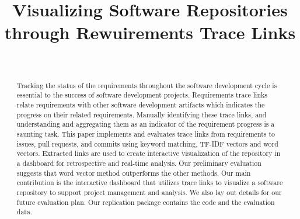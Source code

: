 \documentclass[conference]{IEEEtran}
\begin{document}
\title{Visualizing Software Repositories through Rewuirements Trace Links}

\author{
  \\
}


\maketitle
\begin{abstract}
  Tracking the status of the requirements throughout the software development cycle is essential to the success of software development projects.
  Requirements trace links relate requirements with other software development artifacts which indicates the progress on their related requirements. Manually identifying these trace links, and  understanding and aggregating them as an indicator of the requirement progress is a saunting task.
  This paper implements and evaluates trace links from requirements to issues, pull requests, and commits using keyword matching, TF-IDF vectors and word vectors. Extracted links are used to create interactive visualization of the repository in a dashboard for retrospective and real-time analysis.
  Our preliminary evaluation suggests that word vector method outperforms the other methods.
  Our main contribution is the interactive dashboard that utilizes trace links to visualize a software repository to support project management and analysis. We also lay out details for our future evaluation plan. Our replication package contains the code and the evaluation data.

\end{abstract}
\end{document}
